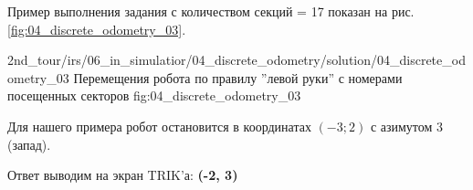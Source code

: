 Пример выполнения задания с количеством секций = 17 показан на рис.\ref{fig:04_discrete_odometry_03}.

             {2nd_tour/irs/06_in_simulatior/04_discrete_odometry/solution/04_discrete_odometry_03}
             {Перемещения робота по правилу ''левой руки'' с номерами посещенных секторов}
             {fig:04_discrete_odometry_03}

Для нашего примера робот остановится в координатах $(-3; 2)$ с азимутом $3$ (запад).

Ответ выводим на экран TRIK'а: \textbf{(-2, 3)}

\codeExample

